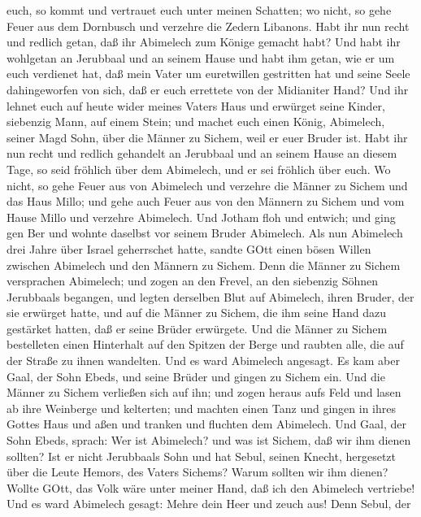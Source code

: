 euch, so kommt und vertrauet euch unter meinen Schatten; wo nicht, so
gehe Feuer aus dem Dornbusch und verzehre die Zedern Libanons.
 Habt ihr nun recht und redlich getan, daß ihr Abimelech
zum Könige gemacht habt? Und habt ihr wohlgetan an Jerubbaal und an
seinem Hause und habt ihm getan, wie er um euch verdienet hat,
 daß mein Vater um euretwillen gestritten hat und seine
Seele dahingeworfen von sich, daß er euch errettete von der Midianiter
Hand?  Und ihr lehnet euch auf heute wider meines Vaters
Haus und erwürget seine Kinder, siebenzig Mann, auf einem Stein; und
machet euch einen König, Abimelech, seiner Magd Sohn, über die Männer zu
Sichem, weil er euer Bruder ist.  Habt ihr nun recht und
redlich gehandelt an Jerubbaal und an seinem Hause an diesem Tage, so
seid fröhlich über dem Abimelech, und er sei fröhlich über euch.
 Wo nicht, so gehe Feuer aus von Abimelech und verzehre die
Männer zu Sichem und das Haus Millo; und gehe auch Feuer aus von den
Männern zu Sichem und vom Hause Millo und verzehre Abimelech.
 Und Jotham floh und entwich; und ging gen Ber und wohnte
daselbst vor seinem Bruder Abimelech.  Als nun Abimelech
drei Jahre über Israel geherrschet hatte,  sandte GOtt
einen bösen Willen zwischen Abimelech und den Männern zu Sichem. Denn
die Männer zu Sichem versprachen Abimelech;  und zogen an
den Frevel, an den siebenzig Söhnen Jerubbaals begangen, und legten
derselben Blut auf Abimelech, ihren Bruder, der sie erwürget hatte, und
auf die Männer zu Sichem, die ihm seine Hand dazu gestärket hatten, daß
er seine Brüder erwürgete.  Und die Männer zu Sichem
bestelleten einen Hinterhalt auf den Spitzen der Berge und raubten alle,
die auf der Straße zu ihnen wandelten. Und es ward Abimelech angesagt.
 Es kam aber Gaal, der Sohn Ebeds, und seine Brüder und
gingen zu Sichem ein. Und die Männer zu Sichem verließen sich auf ihn;
 und zogen heraus aufs Feld und lasen ab ihre Weinberge und
kelterten; und machten einen Tanz und gingen in ihres Gottes Haus und
aßen und tranken und fluchten dem Abimelech.  Und Gaal, der
Sohn Ebeds, sprach: Wer ist Abimelech? und was ist Sichem, daß wir ihm
dienen sollten? Ist er nicht Jerubbaals Sohn und hat Sebul, seinen
Knecht, hergesetzt über die Leute Hemors, des Vaters Sichems? Warum
sollten wir ihm dienen?  Wollte GOtt, das Volk wäre unter
meiner Hand, daß ich den Abimelech vertriebe! Und es ward Abimelech
gesagt: Mehre dein Heer und zeuch aus!  Denn Sebul, der
